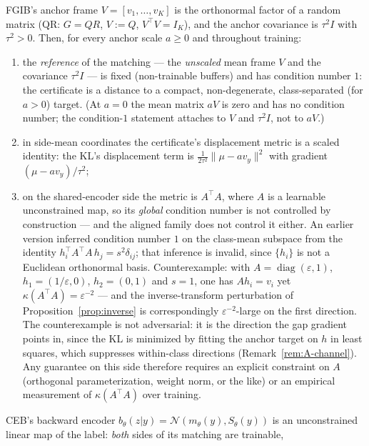 \begin{proposition}\label{prop:conditioning}
FGIB's anchor frame $V = [v_1, \dots, v_K]$ is the orthonormal factor of a random matrix
(QR: $G = QR$, $V := Q$, $V^{\top}V = I_K$), and the anchor covariance is
$\tau^2 I$ with $\tau^2 > 0$.
Then, for every anchor scale $a \ge 0$ and throughout training:
\begin{enumerate}
\item[(i)] the \emph{reference} of the matching --- the \emph{unscaled} mean frame $V$
and the covariance $\tau^2 I$ --- is fixed (non-trainable buffers) and has condition
number $1$: the certificate is a distance to a compact, non-degenerate,
class-separated (for $a > 0$) target. (At $a = 0$ the mean matrix $a V$ is zero and
has no condition number; the condition-$1$ statement attaches to $V$ and $\tau^2 I$,
not to $a V$.)
\item[(ii)] in side-mean coordinates the certificate's displacement metric is a
scaled identity: the KL's displacement term is $\tfrac{1}{2\tau^2}\|\mu - a v_y\|^2$
with gradient $(\mu - a v_y)/\tau^2$;
\item[(iii)] on the shared-encoder side the metric is $A^{\top}A$, where $A$ is a
learnable unconstrained map, so its \emph{global} condition number is not controlled by
construction --- and the aligned family does not control it either. An earlier version
inferred condition number $1$ on the class-mean subspace from the identity
$h_i^{\top} A^{\top} A\, h_j = s^2\delta_{ij}$; that inference is invalid, since
$\{h_i\}$ is not a Euclidean orthonormal basis. Counterexample: with
$A = \operatorname{diag}(\varepsilon, 1)$, $h_1 = (1/\varepsilon, 0)$,
$h_2 = (0, 1)$ and $s = 1$, one has $A h_i = v_i$ yet
$\kappa(A^{\top}A) = \varepsilon^{-2}$ --- and the inverse-transform perturbation of
Proposition~\ref{prop:inverse} is correspondingly $\varepsilon^{-2}$-large on the first
direction. The counterexample is not adversarial: it is the direction the gap gradient
points in, since the KL is minimized by fitting the anchor target on $h$ in least
squares, which suppresses within-class directions
(Remark~\ref{rem:A-channel}). Any guarantee on this side therefore requires an explicit
constraint on $A$ (orthogonal parameterization, weight norm, or the like) or an
empirical measurement of $\kappa(A^{\top}A)$ over training.
\end{enumerate}
CEB's backward encoder $b_\theta(z|y) = \mathcal{N}(m_\theta(y), S_\theta(y))$ is an
unconstrained linear map of the label: \emph{both} sides of its matching are trainable,

\end{proposition}
